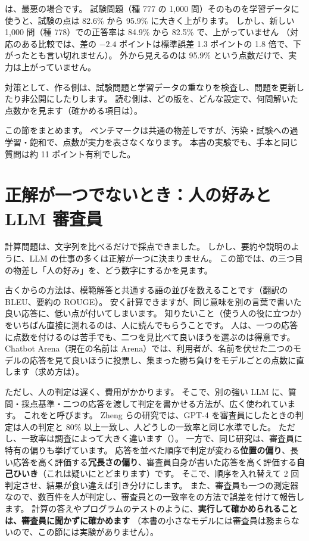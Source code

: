 は、最悪の場合です。
試験問題（種 777 の 1,000 問）そのものを学習データに使うと、試験の点は 82.6\% から 95.9\% に大きく上がります。
しかし、新しい 1,000 問（種 778）での正答率は 84.9\% から 82.5\% で、上がっていません
（対応のある比較では、差の $-2.4$ ポイントは標準誤差 1.3 ポイントの 1.8 倍で、下がったとも言い切れません）。
外から見えるのは 95.9\% という点数だけで、実力は上がっていません。

対策として、作る側は、試験問題と学習データの重なりを検査し、問題を更新したり非公開にしたりします。
読む側は、どの版を、どんな設定で、何問解いた点数かを見ます（確かめる項目は）。

この節をまとめます。
ベンチマークは共通の物差しですが、汚染・試験への過学習・飽和で、点数が実力を表さなくなります。
本書の実験でも、手本と同じ質問は約 11 ポイント有利でした。

\section{正解が一つでないとき：人の好みと LLM 審査員}\label{sec:es-judge}

計算問題は、文字列を比べるだけで採点できました。
しかし、要約や説明のように、LLM の仕事の多くは正解が一つに決まりません。
この節では、の三つ目の物差し「人の好み」を、どう数字にするかを見ます。

古くからの方法は、模範解答と共通する語の並びを数えることです（翻訳の BLEU\cite{papineni2002bleu}、要約の ROUGE\cite{lin2004rouge}）。
安く計算できますが、同じ意味を別の言葉で書いた良い応答に、低い点が付いてしまいます。
知りたいこと（使う人の役に立つか）をいちばん直接に測れるのは、人に読んでもらうことです。
人は、一つの応答に点数を付けるのは苦手でも、二つを見比べて良いほうを選ぶのは得意です。
Chatbot Arena（現在の名前は Arena）\cite{chiang2024chatbot}では、利用者が、名前を伏せた二つのモデルの応答を見て良いほうに投票し、集まった勝ち負けをモデルごとの点数に直します（求め方は）。

ただし、人の判定は遅く、費用がかかります。
そこで、別の強い LLM に、質問・採点基準・二つの応答を渡して判定を書かせる方法が、広く使われています。
これをと呼びます。
Zheng らの研究\cite{zheng2023judging}では、GPT-4 を審査員にしたときの判定は人の判定と 80\% 以上一致し、人どうしの一致率と同じ水準でした。
ただし、一致率は調査によって大きく違います（）。
一方で、同じ研究は、審査員に特有の偏りも挙げています。
応答を並べた順序で判定が変わる\textbf{位置の偏り}、長い応答を高く評価する\textbf{冗長さの偏り}、審査員自身が書いた応答を高く評価する\textbf{自己ひいき}（これは疑いにとどまります）です。
そこで、順序を入れ替えて 2 回判定させ、結果が食い違えば引き分けにします。
また、審査員も一つの測定器なので、数百件を人が判定し、審査員との一致率をの方法で誤差を付けて報告します。
計算の答えやプログラムのテストのように、\textbf{実行して確かめられることは、審査員に聞かずに確かめます}
（本書の小さなモデルには審査員は務まらないので、この節には実験がありません）。

